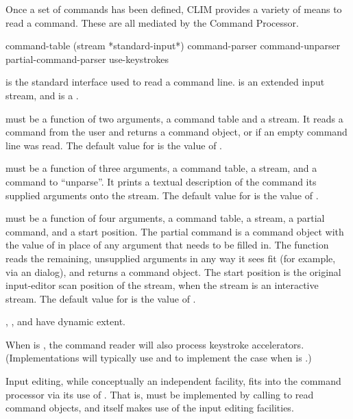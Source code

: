 Once a set of commands has been defined, CLIM provides a variety of means to
read a command.  These are all mediated by the Command Processor.


 {command-table
                       \key (stream *standard-input*)
                            command-parser command-unparser partial-command-parser
                            use-keystrokes}

 is the standard interface used to read a command line.
 is an extended input stream, and  is a
.

 must be a function of two arguments, a command table and a
stream.  It reads a command from the user and returns a command object, or
 if an empty command line was read.  The default value for
 is the value of .

 must be a function of three arguments, a command table, a
stream, and a command to ``unparse''.  It prints a textual description of the
command its supplied arguments onto the stream.  The default value for
 is the value of .

 must be a function of four arguments, a command
table, a stream, a partial command, and a start position.  The partial command
is a command object with the value of  in place
of any argument that needs to be filled in.  The function reads the remaining,
unsupplied arguments in any way it sees fit (for example, via an
 dialog), and returns a command object.  The start position
is the original input-editor scan position of the stream, when the stream is an
interactive stream.  The default value for  is the
value of .

, , and 
have dynamic extent.

When  is , the command reader will also process
keystroke accelerators.  (Implementations will typically use
 and  to
implement the case when  is .)

Input editing, while conceptually an independent facility, fits into the command
processor via its use of .  That is,  must be
implemented by calling  to read command objects, and 
itself makes use of the input editing facilities.


